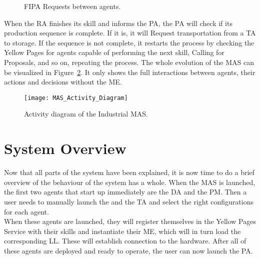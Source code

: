 \begin{figure}[H]
	\centering
	\hspace{0.55cm}
	\caption{\acrshort{FIPA} Requests between agents.}
	\label{fig:agent_requests}
\end{figure}

When the \acrshort{RA} finishes its skill and informs the \acrshort{PA}, the \acrshort{PA} will check if its production sequence is complete. If it is, it will Request transportation from a \acrshort{TA} to storage. If the sequence is not complete, it restarts the process by checking the Yellow Pages for agents capable of performing the next skill, Calling for Proposals, and so on, repeating the process. The whole evolution of the \acrshort{MAS} can be visualized in Figure~\ref{fig:mas_activity_diagram}. It only shows the full interactions between agents, their actions and decisions without the \acrlong{ME}.\\

\begin{figure}[h!]
	\centering
	\texttt{[image: MAS\_Activity\_Diagram]}
	\caption{Activity diagram of the Industrial \acrlong{MAS}.}
	\label{fig:mas_activity_diagram}
\end{figure}

\section{System Overview}
\label{sec:system_overview}

Now that all parts of the system have been explained, it is now time to do a brief overview of the behaviour of the system has a whole. When the \acrshort{MAS} is launched, the first two agents that start up immediately are the \acrlong{DA} and the \acrlong{PM}. Then a user needs to manually launch the  and the \acrlong{TA} and select the right configurations for each agent.\\ 

When these agents are launched, they will register themselves in the Yellow Pages Service with their skills and instantiate their \acrlong{ME}, which will in turn load the corresponding \acrlong{LL}. These  will establish connection to the hardware. After all of these agents are deployed and ready to operate, the user can now launch the \acrlong{PA}.\\

